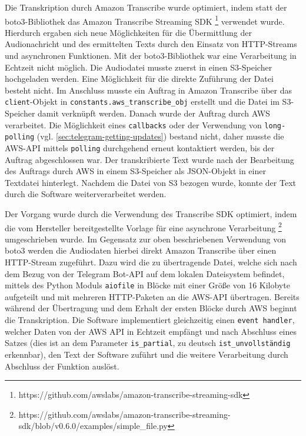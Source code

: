 Die Transkription durch Amazon Transcribe wurde optimiert, indem statt der boto3-Bibliothek das Amazon Transcribe Streaming SDK \footnote{https://github.com/awslabs/amazon-transcribe-streaming-sdk} verwendet wurde. Hierdurch ergaben sich neue Möglichkeiten für die Übermittlung der Audionachricht und des ermittelten Texts durch den Einsatz von HTTP-Streams und asynchronen Funktionen. Mit der boto3-Bibliothek war eine Verarbeitung in Echtzeit nicht möglich. Die Audiodatei musste zuerst in einen S3-Speicher hochgeladen werden. Eine Möglichkeit für die direkte Zuführung der Datei besteht nicht. Im Anschluss musste ein Auftrag in Amazon Transcribe über das \lstinline{client}-Objekt in \lstinline{constants.aws_transcribe_obj} erstellt und die Datei im S3-Speicher damit verknüpft werden. Danach wurde der Auftrag durch AWS verarbeitet. Die Möglichkeit eines \lstinline{callbacks} oder der Verwendung von \lstinline{long-polling} (vgl. \autoref{sec:telegram-getting-updates}) bestand nicht, daher musste die AWS-API mittels \lstinline{polling} durchgehend erneut kontaktiert werden, bis der Auftrag abgeschlossen war. Der transkribierte Text wurde nach der Bearbeitung des Auftrags durch AWS in einem S3-Speicher als JSON-Objekt in einer Textdatei hinterlegt. Nachdem die Datei von S3 bezogen wurde, konnte der Text durch die Software weiterverarbeitet werden.

Der Vorgang wurde durch die Verwendung des Transcribe SDK optimiert, indem die vom Hersteller bereitgestellte Vorlage für eine asynchrone Verarbeitung \footnote{https://github.com/awslabs/amazon-transcribe-streaming-sdk/blob/v0.6.0/examples/simple\_file.py} umgeschrieben wurde. Im Gegensatz zur oben beschriebenen Verwendung von boto3 werden die Audiodaten hierbei direkt Amazon Transcribe über einen HTTP-Stream zugeführt. Dazu wird die zu übertragende Datei, welche sich nach dem Bezug von der Telegram Bot-API auf dem lokalen Dateisystem befindet, mittels des Python Moduls \lstinline{aiofile} in Blöcke mit einer Größe von 16 Kilobyte aufgeteilt und mit mehreren HTTP-Paketen an die AWS-API übertragen. Bereits während der Übertragung und dem Erhalt der ersten Blöcke durch AWS beginnt die Transkription. Die Software implementiert gleichzeitig einen \lstinline{event handler}, welcher Daten von der AWS API in Echtzeit empfängt und nach Abschluss eines Satzes (dies ist an dem Parameter \lstinline{is_partial}, zu deutsch \lstinline{ist_unvollständig} erkennbar), den Text der Software zuführt und die weitere Verarbeitung durch Abschluss der Funktion auslöst.

